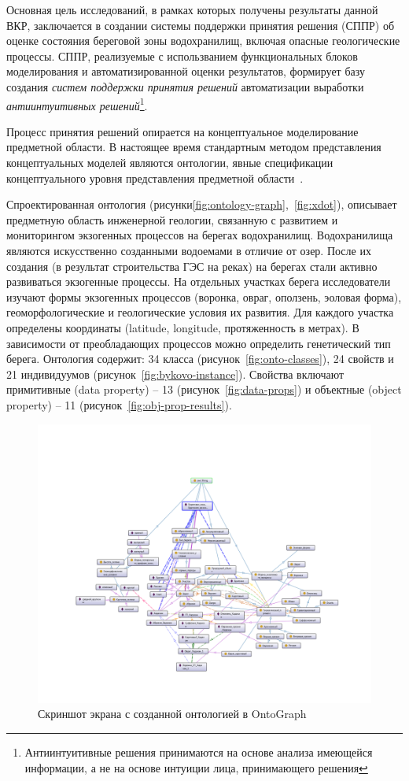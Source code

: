 \documentclass[732,fontsize=14pt,final]{studrep}
\begin{document}
Основная цель исследований, в рамках которых получены результаты данной ВКР, заключается в создании системы поддержки принятия решения (СППР) об оценке состояния береговой зоны водохранилищ, включая опасные геологические процессы. СППР, реализуемые с использванием функциональных блоков моделирования и автоматизированной оценки результатов, формирует базу создания \emph{систем поддержки принятия решений} автоматизации выработки \emph{антиинтуитивных решений}\footnote{Антиинтуитивные решения принимаются на основе анализа имеющейся информации, а не на основе интуиции лица, принимающего решения}.

Процесс принятия решений опирается на концептуальное моделирование предметной области. В настоящее время стандартным методом представления концептуальных моделей являются онтологии, явные спецификации концептуального уровня представления предметной области~\cite{gruber}.

Спроектированная онтология (рисунки\ref{fig:ontology-graph},~\ref{fig:xdot}), описывает предметную область инженерной геологии, связанную с развитием и мониторингом экзогенных процессов на берегах водохранилищ. Водохранилища являются искусственно созданными водоемами в отличие от озер. После их создания (в результат строительства ГЭС на реках) на берегах стали активно развиваться экзогенные процессы. На отдельных участках берега исследователи изучают формы экзогенных процессов (воронка, овраг, оползень, эоловая форма), геоморфологические и геологические условия их развития. Для каждого участка определены координаты (latitude, longitude, протяженность в метрах). В зависимости от преобладающих процессов можно определить генетический тип берега. Онтология содержит: 34 класса (рисунок~\ref{fig:onto-classes}), 24 свойств и 21 индивидуумов (рисунок~\ref{fig:bykovo-instance}). Свойства включают примитивные (data property) – 13 (рисунок~\ref{fig:data-props}) и объектные (object property) – 11 (рисунок~\ref{fig:obj-prop-results}).

  \begin{figure}[htp]
	\centering
	\includegraphics[width=\linewidth]{pics/image6.png}
    \caption{Скриншот экрана с созданной онтологией в OntoGraph}
    \label{fig:}
  \end{figure}
\end{document}
